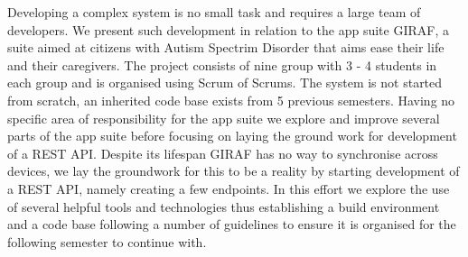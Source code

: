 Developing a complex system is no small task and requires a large team of developers.
We present such development in relation to the app suite GIRAF, a suite aimed at citizens with Autism Spectrim Disorder that aims ease their life and their caregivers.
The project consists of nine group with 3 - 4 students in each group and is organised using Scrum of Scrums.
The system is not started from scratch, an inherited code base exists from 5 previous semesters.
Having no specific area of responsibility for the app suite we explore and improve several parts of the app suite before focusing on laying the ground work for development of a REST API.
Despite its lifespan GIRAF has no way to synchronise across devices, we lay the groundwork for this to be a reality by starting development of a REST API, namely creating a few endpoints.
In this effort we explore the use of several helpful tools and technologies thus establishing a build environment and a code base following a number of guidelines to ensure it is organised for the following semester to continue with.